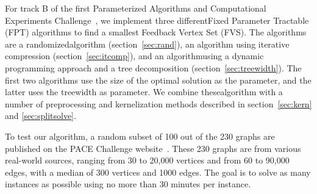 For track B of the first Parameterized Algorithms and Computational Experiments Challenge~\cite{pace}, we implement three
differentFixed Parameter Tractable (FPT) algorithms to find a smallest Feedback Vertex Set (FVS). The algorithms are a
randomizedalgorithm (section~\ref{sec:rand}), an algorithm using iterative compression (section~\ref{sec:itcomp}), and an 
algorithmusing a dynamic programming approach and a tree decomposition (section~\ref{sec:treewidth}). The first two
algorithms use the size of the optimal solution as the parameter, and the latter uses the treewidth as parameter. We
combine thesealgorithm with a number of preprocessing and kernelization methods described in section~\ref{sec:kern} and
\ref{sec:splitsolve}.

To test our algorithm, a random subset of 100 out of the 230 graphs are published on the PACE Challenge
website~\cite{pace}. These 230 graphs are from various real-world sources, ranging from 30 to 20,000 vertices and from 60 to 90,000 edges, with a median of 300 vertices and 1000 edges. The goal is to solve as many instances as possible using no more than 30 minutes per instance.